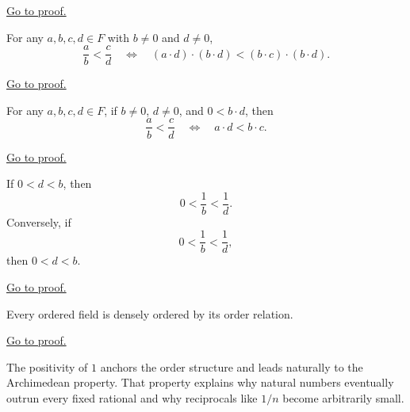 \begin{remark*}[Proof]
\hyperref[prf:positive-fraction-iff-positive-product]{Go to proof.}
\end{remark*}

\begin{theorem}
\label{thm:fraction-order-comparison-general}
For any $a,b,c,d\in F$ with $b\neq 0$ and $d\neq 0$,
\[
\frac{a}{b}<\frac{c}{d}
\quad\Longleftrightarrow\quad
(a\cdot d)\cdot(b\cdot d)<(b\cdot c)\cdot(b\cdot d).
\]
\end{theorem}

\begin{remark*}[Proof]
\hyperref[prf:fraction-order-comparison-general]{Go to proof.}
\end{remark*}

\begin{theorem}
\label{thm:fraction-order-comparison-positive-denominator-product}
For any $a,b,c,d\in F$, if $b\neq 0$, $d\neq 0$, and $0<b\cdot d$, then
\[
\frac{a}{b}<\frac{c}{d}
\quad\Longleftrightarrow\quad
a\cdot d<b\cdot c.
\]
\end{theorem}

\begin{remark*}[Proof]
\hyperref[prf:fraction-order-comparison-positive-denominator-product]{Go to proof.}
\end{remark*}

\begin{theorem}
\label{thm:reciprocal-order-for-positive-elements}
If $0<d<b$, then
\[
0<\frac{1}{b}<\frac{1}{d}.
\]
Conversely, if
\[
0<\frac{1}{b}<\frac{1}{d},
\]
then $0<d<b$.
\end{theorem}

\begin{remark*}[Proof]
\hyperref[prf:reciprocal-order-for-positive-elements]{Go to proof.}
\end{remark*}

\begin{theorem}
\label{thm:ordered-fields-are-densely-ordered}
Every ordered field is densely ordered by its order relation.
\end{theorem}

\begin{remark*}[Proof]
\hyperref[prf:ordered-fields-are-densely-ordered]{Go to proof.}
\end{remark*}

\begin{remark}[Transition]
\label{rem:arch-v-complete}
The positivity of $1$ anchors the order structure and leads naturally to
the Archimedean property. That property explains why natural numbers
eventually outrun every fixed rational and why reciprocals like $1/n$
become arbitrarily small.
\end{remark}
